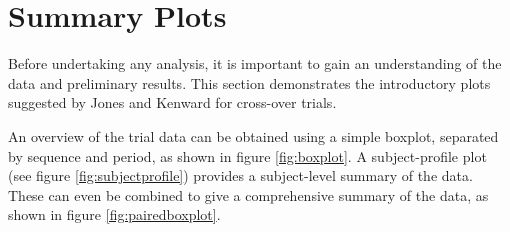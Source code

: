 \documentclass[12pt, TexShade, letterpaper]{report}
\begin{document}


\section{Summary Plots}
Before undertaking any analysis, it is important to gain an understanding of the data and preliminary results. This section demonstrates the introductory plots suggested by Jones and Kenward \cite{jones2003design} for cross-over trials.

An overview of the trial data can be obtained using a simple boxplot, separated by sequence and period, as shown in figure \ref{fig:boxplot}. A subject-profile plot (see figure \ref{fig:subjectprofile}) provides a subject-level summary of the data. These can even be combined to give a comprehensive summary of the data, as shown in figure \ref{fig:pairedboxplot}.
\end{document}
